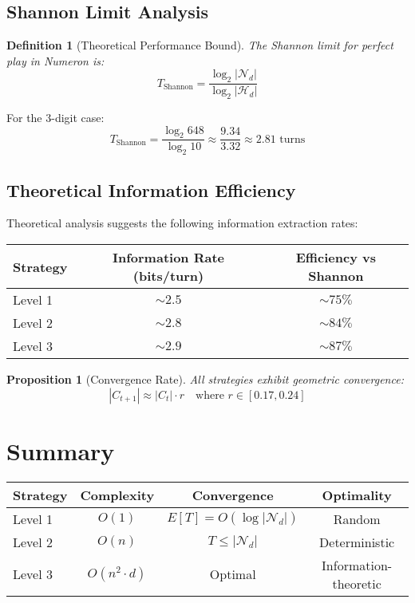 \documentclass{article}
\newtheorem{definition}{Definition}
\newtheorem{proposition}{Proposition}
\begin{document}
\subsection{Shannon Limit Analysis}

\begin{definition}[Theoretical Performance Bound]
The Shannon limit for perfect play in Numeron is:
$$T_{\text{Shannon}} = \frac{\log_2 |\mathcal{N}_d|}{\log_2 |\mathcal{H}_d|}$$
\end{definition}

For the 3-digit case:
$$T_{\text{Shannon}} = \frac{\log_2 648}{\log_2 10} \approx \frac{9.34}{3.32} \approx 2.81 \text{ turns}$$

\subsection{Theoretical Information Efficiency}

Theoretical analysis suggests the following information extraction rates:

\begin{center}
\begin{tabular}{lcc}
\toprule
Strategy & Information Rate (bits/turn) & Efficiency vs Shannon \\
\midrule
Level 1 & $\sim 2.5$ & $\sim 75\%$ \\
Level 2 & $\sim 2.8$ & $\sim 84\%$ \\
Level 3 & $\sim 2.9$ & $\sim 87\%$ \\
\bottomrule
\end{tabular}
\end{center}

\begin{proposition}[Convergence Rate]
All strategies exhibit geometric convergence:
$$|C_{t+1}| \approx |C_t| \cdot r \quad \text{where } r \in [0.17, 0.24]$$
\end{proposition}




\section{Summary}

\begin{center}
\begin{tabular}{lccc}
\toprule
Strategy & Complexity & Convergence & Optimality \\
\midrule
Level 1 & $O(1)$ & $E[T] = O(\log |\mathcal{N}_d|)$ & Random \\
Level 2 & $O(n)$ & $T \leq |\mathcal{N}_d|$ & Deterministic \\
Level 3 & $O(n^2 \cdot d)$ & Optimal & Information-theoretic \\
\bottomrule
\end{tabular}
\end{center}
\end{document}
